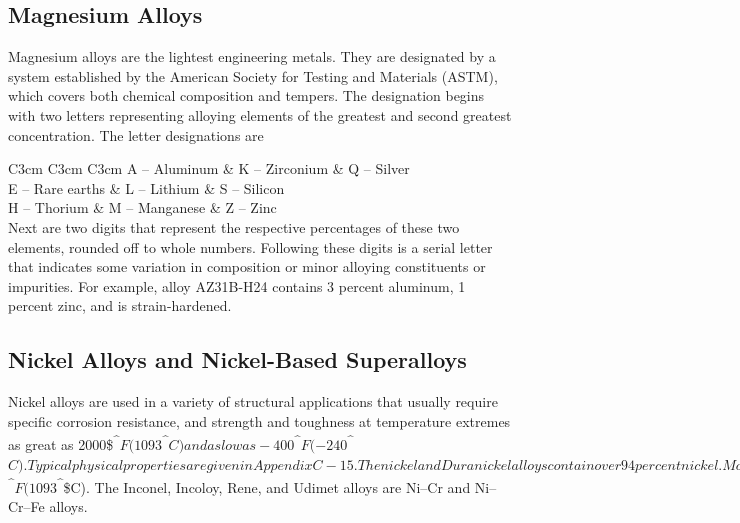 \documentclass[a4paper,openany,12pt]{book}
\begin{document}
\subsection{Magnesium Alloys}
\label{magnesium-alloys}
Magnesium alloys are the lightest engineering metals. They are
designated by a system established by the American Society for Testing
and Materials (ASTM), which covers both chemical composition and
tempers. The designation begins with two letters representing alloying
elements of the greatest and second greatest concentration. The letter
designations are


 C3cm C3cm C3cm A -- Aluminum \& K -- Zirconium \& Q -- Silver\\
E -- Rare earths \& L -- Lithium \& S -- Silicon\\
H -- Thorium \& M -- Manganese \& Z -- Zinc\\

Next are two digits that represent the respective percentages of these
two elements, rounded off to whole numbers. Following these digits is a
serial letter that indicates some variation in composition or minor
alloying constituents or impurities. For example, alloy AZ31B-H24
contains 3 percent aluminum, 1 percent zinc, and is strain-hardened.

\subsection{Nickel Alloys and Nickel-Based Superalloys}
\label{nickel-alloys-and-nickel-based-superalloys}
Nickel alloys are used in a variety of structural applications that
usually require specific corrosion resistance, and strength and
toughness at temperature extremes as great as 2000\$\textsuperscript{\^{}}\(F
(1093\)\textsuperscript{\^{}}\(C) and as low as -400\)\textsuperscript{\^{}}\(F (-240\)\textsuperscript{\^{}}\(C). Typical
physical properties are given in Appendix C-15. The nickel and
Duranickel alloys contain over 94 percent nickel. Monel represents a
series of nickel--copper alloys, based on the mutual solubility of these
two elements in all proportions. They are strong and tough at subzero
temperatures, and especially resistant to stress corrosion cracking.
Hastelloy designates a series of Ni--Mo and Ni--Mo--Cr superalloys.
Several Hastelloys resist oxidation and maintain useful strength and
creep properties in the range of 2000\)\textsuperscript{\^{}}\(F (1093\)\textsuperscript{\^{}}\$C). The
Inconel, Incoloy, Rene, and Udimet alloys are Ni--Cr and Ni--Cr--Fe
alloys.
\end{document}
